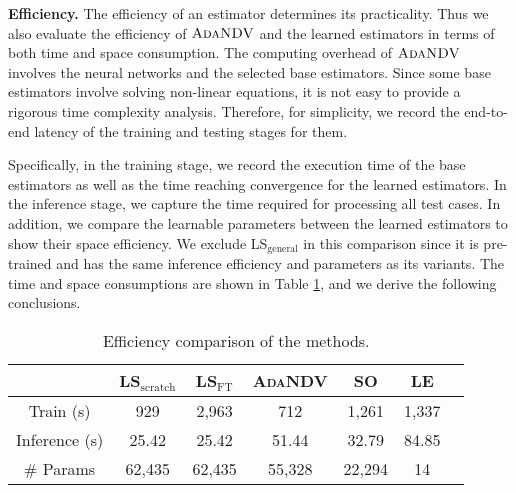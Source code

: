 \noindent\textbf{Efficiency.} 
The efficiency of an estimator determines its practicality. 
Thus we also evaluate the efficiency of $\textsc{AdaNDV}$ and the learned estimators in terms of both time and space consumption.
The computing overhead of $\textsc{AdaNDV}$ involves the neural networks and the selected base estimators. 
Since some base estimators involve solving non-linear equations, it is not easy to provide a rigorous time complexity analysis. 
Therefore, for simplicity, we record the end-to-end latency of the training and testing stages for them.

Specifically, in the training stage, we record the execution time of the base estimators as well as the time reaching convergence for the learned estimators. 
In the inference stage, we capture the time required for processing all test cases. 
In addition, we compare the learnable parameters between the learned estimators to show their space efficiency. We exclude LS$_{\mathrm{general}}$ in this comparison since it is pre-trained and has the same inference efficiency and parameters as its variants.
The time and space consumptions are shown in Table \ref{tab:efficiency}, and we derive the following conclusions.




\begin{table}[]
    \centering
    \caption{Efficiency comparison of the methods.}
    \begin{tabular}{ccccccc}
\toprule
         & LS$_{\mathrm{scratch}}$ & LS$_{\mathrm{FT}}$ & \textsc{AdaNDV} & SO & LE \\
\midrule
        Train (s) & 929 & 2,963 & {712} & 1,261 & 1,337\\
        Inference (s)   & 25.42 & 25.42 & 51.44 &  32.79  & 84.85 \\
        \# Params& 62,435 & 62,435 & 55,328 & 22,294  & 14  \\
\bottomrule
    \end{tabular}
    \label{tab:efficiency}
\end{table}



